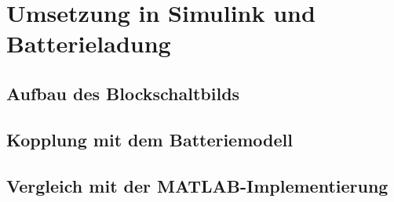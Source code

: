 \section{Umsetzung in Simulink und Batterieladung}
\label{sec:simulink}


\subsection{Aufbau des Blockschaltbilds}


\subsection{Kopplung mit dem Batteriemodell}

\subsection{Vergleich mit der MATLAB-Implementierung}

